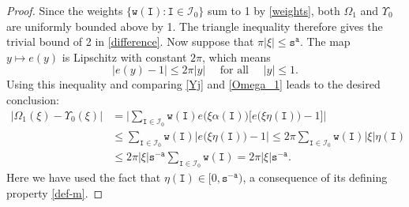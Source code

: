\documentclass[12pt, twoside]{article}
\theoremstyle{definition}
\numberwithin{equation}{section}
\begin{document}
\begin{proof} 
Since the weights $\{\mathtt w(\mathtt I): \mathtt I \in \mathscr{I}_0 \}$ sum to 1 by \eqref{weights}, both $\Omega_1$ and $\Upsilon_0$ are uniformly bounded above by 1. The triangle inequality therefore gives the trivial bound of 2 in \eqref{difference}. Now suppose that $\pi |\xi| \leq \mathtt s^{\mathtt a}$. The map $y \mapsto e(y)$ is Lipschitz with constant $2 \pi$, which means 
\begin{equation} \label{Lipschitz} 
|e(y) -1 | \leq 2\pi |y| \quad \text{ for all } \quad |y| \leq 1.
\end{equation} 
Using this inequality and comparing \eqref{Yj} and \eqref{Omega_1} leads to the desired conclusion: 
\begin{align*}
|\Omega_1(\xi) - \Upsilon_0(\xi)| &= \Biggl| \sum_{\mathtt I \in \mathscr{I}_0} \mathtt w(\mathtt I) e \bigl(\xi \alpha(\mathtt I)\bigr) \bigl[ e \bigl(\xi\eta(\mathtt I)\bigr) - 1\bigr] \Biggr| \\
& \leq   \sum_{\mathtt I \in \mathscr{I}_0} \mathtt w(\mathtt I) \bigl|  e \bigl(\xi \eta(\mathtt I)\bigr) - 1 \bigr| \leq 2 \pi \sum_{\mathtt I \in \mathscr{I}_0} \mathtt w(\mathtt I) |\xi|  \eta(\mathtt I) \\
&\leq 2 \pi |\xi| \mathtt s^{-\mathtt a} \sum_{\mathtt I \in \mathscr{I}_0} \mathtt w(\mathtt I)  = 2 \pi |\xi| \mathtt s^{-\mathtt a}.
\end{align*} 
Here we have used the fact that $\eta(\mathtt I) \in [0, \mathtt s^{-\mathtt a})$, a consequence of its defining property \eqref{def-m}.
\end{proof}
\end{document}

